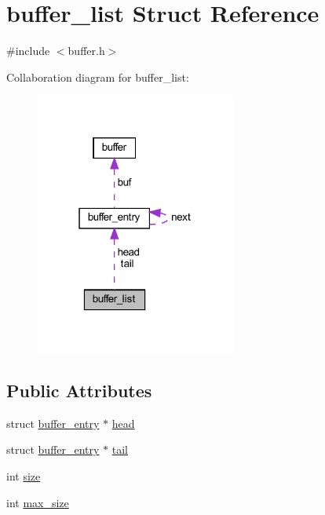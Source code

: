 \hypertarget{structbuffer__list}{}\section{buffer\+\_\+list Struct Reference}
\label{structbuffer__list}


{\ttfamily \#include $<$buffer.\+h$>$}



Collaboration diagram for buffer\+\_\+list\+:
\nopagebreak
\begin{figure}[H]
\begin{center}
\leavevmode
\includegraphics[width=187pt]{structbuffer__list__coll__graph}
\end{center}
\end{figure}
\subsection*{Public Attributes}
\begin{DoxyCompactItemize}
\item 
struct \hyperlink{structbuffer__entry}{buffer\+\_\+entry} $\ast$ \hyperlink{structbuffer__list_afaecc74fd9a1fdcc9a0d707f6c8519f6}{head}
\item 
struct \hyperlink{structbuffer__entry}{buffer\+\_\+entry} $\ast$ \hyperlink{structbuffer__list_ab1d10be66880cdccbfe888d8e487d3b3}{tail}
\item 
int \hyperlink{structbuffer__list_aeb4047df8b6044b88cb2c5f1803c998e}{size}
\item 
int \hyperlink{structbuffer__list_ad65e80969c5347f450728c8f3c149dd1}{max\+\_\+size}
\end{DoxyCompactItemize}


